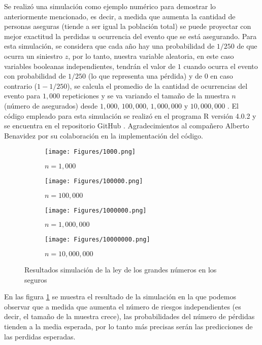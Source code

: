 \documentclass{article}
\begin{document}
Se realizó una simulación como ejemplo numérico para demostrar lo anteriormente mencionado, es decir, a medida que aumenta la cantidad de personas aseguras (tiende a ser igual la población total) se puede proyectar con mejor exactitud la perdidas u ocurrencia del evento que se está asegurando. Para esta simulación, se considera que cada año hay una probabilidad de $1/250$ de que ocurra un siniestro $z$, por lo tanto, nuestra variable aleatoria, en este caso variables booleanas independientes, tendrán el valor de $1$ cuando ocurra el evento con probabilidad de $1/250$ (lo que representa una pérdida) y de $0$ en caso contrario ($1-1/250$), se calcula el promedio de la cantidad de ocurrencias del evento para $1,000$ repeticiones y se va variando el tamaño de la muestra $n$ (número de asegurados) desde $1,000$, $100,000$, $1,000,000$ y $10,000,000$ \cite{notasdeclaseinsurance}. El código empleado para esta simulación se realizó en el programa R versión 4.0.2 \cite{r} y se encuentra en el repositorio GitHub \cite{github}. Agradecimientos al compañero Alberto Benavidez por su colaboración en la implementación del código.

\begin{figure}[h]
    \begin{center}
    \captionsetup{justification=centering}
    \begin{subfigure}[b]{0.5\textwidth}
        \texttt{[image: Figures/1000.png]}
        \caption{$n=1,000$}
    \end{subfigure}
    \begin{subfigure}[b]{0.4\textwidth}
        \texttt{[image: Figures/100000.png]}
        \caption{$n=100,000$}
    \end{subfigure}
        \begin{subfigure}[b]{0.5\textwidth}
        \texttt{[image: Figures/1000000.png]}
        \caption{$n=1,000,000$}
    \end{subfigure}
    \begin{subfigure}[b]{0.4\textwidth}
        \texttt{[image: Figures/10000000.png]}
        \caption{$n=10,000,000$}
    \end{subfigure}
    \caption{Resultados simulación de la ley de los grandes números en los seguros}
    \label{resultados}
    \end{center}
\end{figure}

En las figura \ref{resultados} se muestra el resultado de la simulación en la que podemos observar que a medida que aumenta el número de riesgos independientes (es decir, el tamaño de la muestra crece), las probabilidades del número de pérdidas tienden a la media esperada, por lo tanto más precisas serán las predicciones de las perdidas esperadas.




\end{document}

